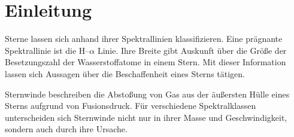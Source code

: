 \section{Einleitung}
Sterne lassen sich anhand ihrer Spektrallinien klassifizieren.
Eine prägnante Spektrallinie ist die H--$\alpha $ Linie.
Ihre Breite gibt Auskunft über die Größe der Besetzungszahl der Wasserstoffatome in einem Stern.
Mit dieser Information lassen sich Aussagen über die Beschaffenheit eines Sterns tätigen.

Sternwinde beschreiben die Abstoßung von Gas aus der äußersten Hülle eines Sterns aufgrund von Fusionsdruck.
Für verschiedene Spektralklassen unterscheiden sich Sternwinde nicht nur in ihrer Masse und Geschwindigkeit, sondern auch durch ihre Ursache.
